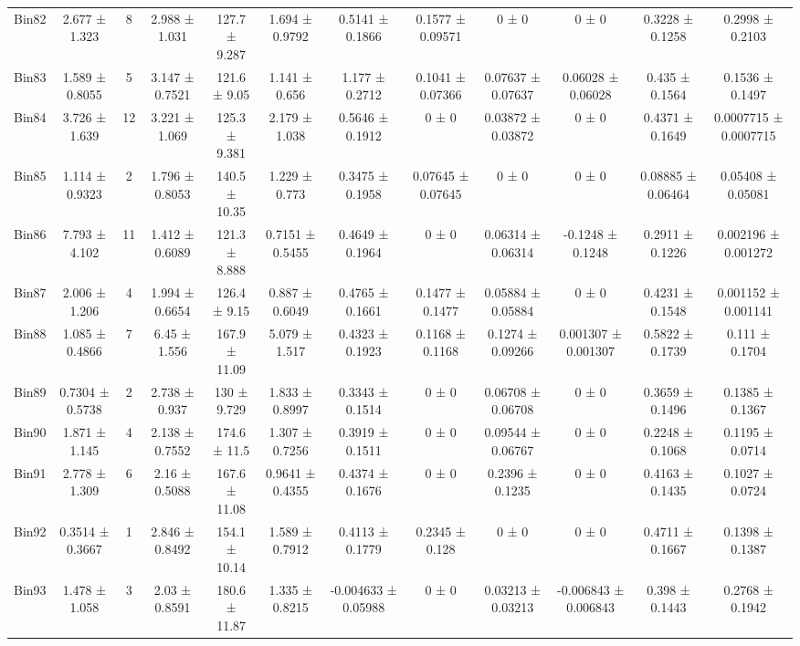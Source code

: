 \begin{tabular}{@{\extracolsep{4pt}}lccccccccccc@{}}
     Bin82 & 2.677 ± 1.323 & 8 & 2.988 ± 1.031 & 127.7 ± 9.287 & 1.694 ± 0.9792 & 0.5141 ± 0.1866 & 0.1577 ± 0.09571 & 0 ± 0 & 0 ± 0 & 0.3228 ± 0.1258 & 0.2998 ± 0.2103 \\ 
     Bin83 & 1.589 ± 0.8055 & 5 & 3.147 ± 0.7521 & 121.6 ± 9.05 & 1.141 ± 0.656 & 1.177 ± 0.2712 & 0.1041 ± 0.07366 & 0.07637 ± 0.07637 & 0.06028 ± 0.06028 & 0.435 ± 0.1564 & 0.1536 ± 0.1497 \\ 
     Bin84 & 3.726 ± 1.639 & 12 & 3.221 ± 1.069 & 125.3 ± 9.381 & 2.179 ± 1.038 & 0.5646 ± 0.1912 & 0 ± 0 & 0.03872 ± 0.03872 & 0 ± 0 & 0.4371 ± 0.1649 & 0.0007715 ± 0.0007715 \\ 
     Bin85 & 1.114 ± 0.9323 & 2 & 1.796 ± 0.8053 & 140.5 ± 10.35 & 1.229 ± 0.773 & 0.3475 ± 0.1958 & 0.07645 ± 0.07645 & 0 ± 0 & 0 ± 0 & 0.08885 ± 0.06464 & 0.05408 ± 0.05081 \\ 
     Bin86 & 7.793 ± 4.102 & 11 & 1.412 ± 0.6089 & 121.3 ± 8.888 & 0.7151 ± 0.5455 & 0.4649 ± 0.1964 & 0 ± 0 & 0.06314 ± 0.06314 & -0.1248 ± 0.1248 & 0.2911 ± 0.1226 & 0.002196 ± 0.001272 \\ 
     Bin87 & 2.006 ± 1.206 & 4 & 1.994 ± 0.6654 & 126.4 ± 9.15 & 0.887 ± 0.6049 & 0.4765 ± 0.1661 & 0.1477 ± 0.1477 & 0.05884 ± 0.05884 & 0 ± 0 & 0.4231 ± 0.1548 & 0.001152 ± 0.001141 \\ 
     Bin88 & 1.085 ± 0.4866 & 7 & 6.45 ± 1.556 & 167.9 ± 11.09 & 5.079 ± 1.517 & 0.4323 ± 0.1923 & 0.1168 ± 0.1168 & 0.1274 ± 0.09266 & 0.001307 ± 0.001307 & 0.5822 ± 0.1739 & 0.111 ± 0.1704 \\ 
     Bin89 & 0.7304 ± 0.5738 & 2 & 2.738 ± 0.937 & 130 ± 9.729 & 1.833 ± 0.8997 & 0.3343 ± 0.1514 & 0 ± 0 & 0.06708 ± 0.06708 & 0 ± 0 & 0.3659 ± 0.1496 & 0.1385 ± 0.1367 \\ 
     Bin90 & 1.871 ± 1.145 & 4 & 2.138 ± 0.7552 & 174.6 ± 11.5 & 1.307 ± 0.7256 & 0.3919 ± 0.1511 & 0 ± 0 & 0.09544 ± 0.06767 & 0 ± 0 & 0.2248 ± 0.1068 & 0.1195 ± 0.0714 \\ 
     Bin91 & 2.778 ± 1.309 & 6 & 2.16 ± 0.5088 & 167.6 ± 11.08 & 0.9641 ± 0.4355 & 0.4374 ± 0.1676 & 0 ± 0 & 0.2396 ± 0.1235 & 0 ± 0 & 0.4163 ± 0.1435 & 0.1027 ± 0.0724 \\ 
     Bin92 & 0.3514 ± 0.3667 & 1 & 2.846 ± 0.8492 & 154.1 ± 10.14 & 1.589 ± 0.7912 & 0.4113 ± 0.1779 & 0.2345 ± 0.128 & 0 ± 0 & 0 ± 0 & 0.4711 ± 0.1667 & 0.1398 ± 0.1387 \\ 
     Bin93 & 1.478 ± 1.058 & 3 & 2.03 ± 0.8591 & 180.6 ± 11.87 & 1.335 ± 0.8215 & -0.004633 ± 0.05988 & 0 ± 0 & 0.03213 ± 0.03213 & -0.006843 ± 0.006843 & 0.398 ± 0.1443 & 0.2768 ± 0.1942 \\ 

\end{tabular}
